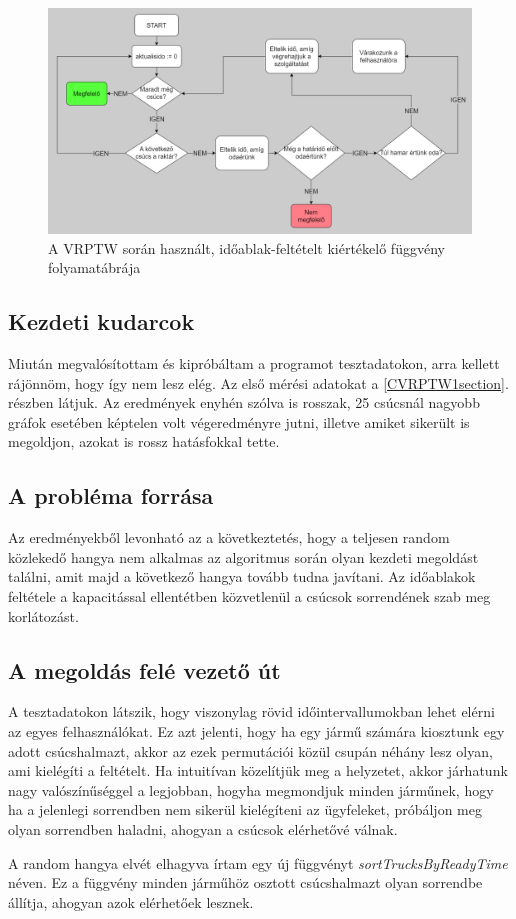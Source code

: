 \begin{figure}[ht!]
	\centering
	\includegraphics[width=150mm, keepaspectratio]{figures/timeWindow.drawio.png}
	\caption{A VRPTW során használt, időablak-feltételt kiértékelő függvény folyamatábrája }
	\label{fig:VRPTW_chart}
\end{figure}

\subsection{Kezdeti kudarcok}
Miután megvalósítottam és kipróbáltam a programot tesztadatokon, arra kellett rájönnöm, hogy így nem lesz elég. Az első mérési adatokat a \ref{CVRPTW1section}. részben látjuk. Az eredmények enyhén szólva is rosszak, 25 csúcsnál nagyobb gráfok esetében képtelen volt végeredményre jutni, illetve amiket sikerült is megoldjon, azokat is rossz hatásfokkal tette.

\subsection{A probléma forrása} Az eredményekből levonható az a következtetés, hogy a teljesen random közlekedő hangya nem alkalmas az algoritmus során olyan kezdeti megoldást találni, amit majd a következő hangya tovább tudna javítani. Az időablakok feltétele a kapacitással ellentétben közvetlenül a csúcsok sorrendének szab meg korlátozást. 

\subsection{A megoldás felé vezető út}
A tesztadatokon látszik, hogy viszonylag rövid időintervallumokban lehet elérni az egyes felhasználókat. Ez azt jelenti, hogy ha egy jármű számára kiosztunk egy adott csúcshalmazt, akkor az ezek permutációi közül csupán néhány lesz olyan, ami kielégíti a feltételt. Ha intuitívan közelítjük meg a helyzetet, akkor járhatunk nagy valószínűséggel a legjobban, hogyha megmondjuk minden járműnek, hogy ha a jelenlegi sorrendben nem sikerül kielégíteni az ügyfeleket, próbáljon meg olyan sorrendben haladni, ahogyan a csúcsok elérhetővé válnak.

A random hangya elvét elhagyva írtam egy új függvényt \textit{sortTrucksByReadyTime} néven. Ez a függvény minden járműhöz osztott csúcshalmazt olyan sorrendbe állítja, ahogyan azok elérhetőek lesznek.
